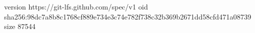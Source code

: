 version https://git-lfs.github.com/spec/v1
oid sha256:98dc7a8b8c1768cf889e734e3c74e782f738c32b369b2671dd58cfd471a08739
size 87544
